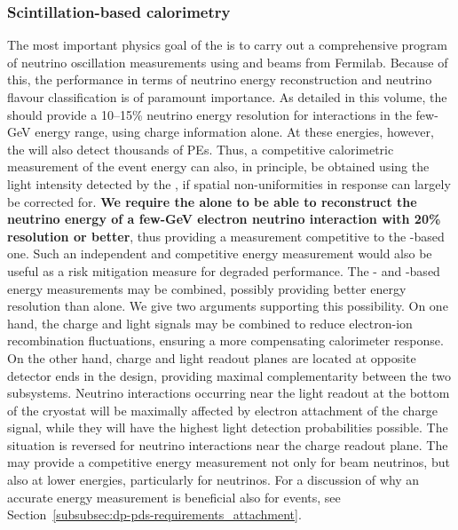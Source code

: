 \subsubsection{Scintillation-based calorimetry}

The most important physics goal of the \dune {} is to carry out a comprehensive program of neutrino oscillation measurements using \numu and \anumu beams from Fermilab. Because of this, the \dune {} performance in terms of neutrino energy reconstruction and neutrino flavour classification is of paramount importance. As detailed in this volume, the  should provide a 10--15\% neutrino energy resolution for \nue {} interactions in the few-GeV energy range, using charge information alone. At these energies, however, the  
will also detect thousands of PEs. Thus, a competitive calorimetric measurement of the event energy can also, in principle, be obtained using the light intensity detected by the , if spatial non-uniformities in  response can largely be corrected for. {\bf We require the  alone to be able to reconstruct the neutrino energy of a few-GeV electron neutrino  interaction with 20\%  resolution or better}, thus providing a measurement competitive to the -based one. Such an independent and competitive energy measurement would also be useful as a risk mitigation measure for degraded  performance. The - and -based energy measurements may be combined, possibly providing better energy resolution than  alone. We give two arguments 
supporting this possibility. On one hand, the charge and light signals may be combined to reduce electron-ion recombination fluctuations, ensuring a more compensating  calorimeter response. On the other hand, charge and light readout planes are located at opposite detector ends in the  design, providing maximal complementarity between the two subsystems. Neutrino interactions occurring near the light readout at the bottom of the cryostat will be maximally affected by electron attachment of the charge signal, while they will have the highest light detection probabilities possible. The situation is reversed for neutrino interactions near the 
charge readout plane. The  may provide a competitive energy measurement not only for beam neutrinos, but also at lower energies, particularly for  neutrinos. For a discussion of why an accurate energy measurement is beneficial also for  events, see Section~\ref{subsubsec:dp-pds-requirements_attachment}.

